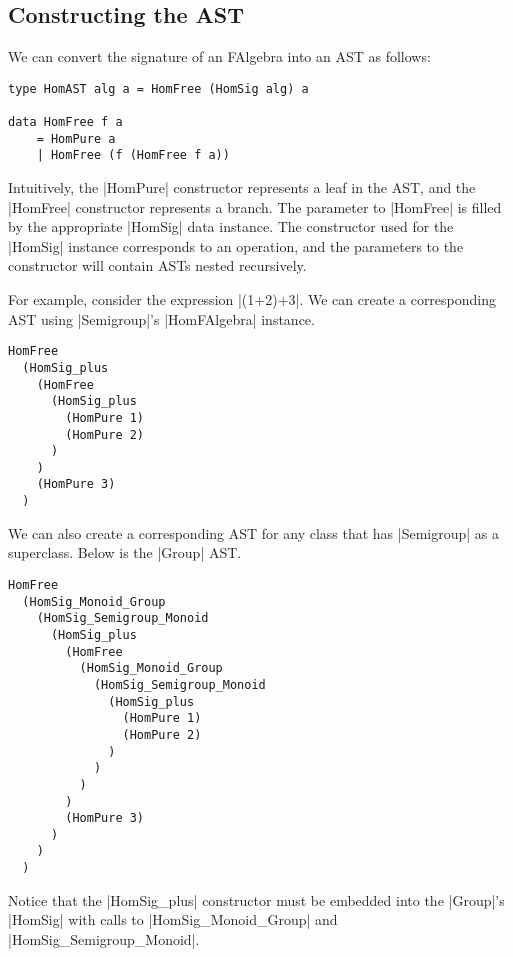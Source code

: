 \documentclass[preprint]{sigplanconf}
\theoremstyle{definition}
\begin{document}

\subsection{Constructing the AST}

We can convert the signature of an FAlgebra into an AST as follows:
\begin{lstlisting}
type HomAST alg a = HomFree (HomSig alg) a

data HomFree f a
    = HomPure a
    | HomFree (f (HomFree f a))
\end{lstlisting}
Intuitively,
the |HomPure| constructor represents a leaf in the AST,
and the |HomFree| constructor represents a branch.
The parameter to |HomFree| is filled by the appropriate |HomSig| data instance.
The constructor used for the |HomSig| instance corresponds to an operation,
and the parameters to the constructor will contain ASTs nested recursively.

For example, consider the expression |(1+2)+3|.
We can create a corresponding AST using |Semigroup|'s |HomFAlgebra| instance.
\begin{lstlisting}
HomFree
  (HomSig_plus
    (HomFree
      (HomSig_plus
        (HomPure 1)
        (HomPure 2)
      )
    )
    (HomPure 3)
  )
\end{lstlisting}
We can also create a corresponding AST for any class that has |Semigroup| as a superclass.
Below is the |Group| AST.
\begin{lstlisting}
HomFree
  (HomSig_Monoid_Group
    (HomSig_Semigroup_Monoid
      (HomSig_plus
        (HomFree
          (HomSig_Monoid_Group
            (HomSig_Semigroup_Monoid
              (HomSig_plus
                (HomPure 1)
                (HomPure 2)
              )
            )
          )
        )
        (HomPure 3)
      )
    )
  )
\end{lstlisting}
Notice that the |HomSig_plus| constructor must be embedded into the |Group|'s |HomSig| with calls to |HomSig_Monoid_Group| and |HomSig_Semigroup_Monoid|.
\end{document}
